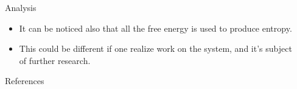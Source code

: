 \documentclass[final]{beamer}
\newlength{\sepwidth}
\newlength{\colwidth}
\newcommand{\separatorcolumn}{\begin{column}{\sepwidth}\end{column}}
\begin{document}
\begin{frame}[t]
\begin{columns}[t]
\begin{column}{\colwidth}
\begin{block}{Analysis}
\begin{itemize}

\item It can be noticed also that all the free energy is used to produce entropy.

\item This could be different if one realize work on the system, and it's subject of further research.
\end{itemize}
\end{block}
\begin{block}{References}

\nocite{*}
\footnotesize{}

\end{block}

\end{column}

\separatorcolumn
\end{columns}
\end{frame}
\end{document}

